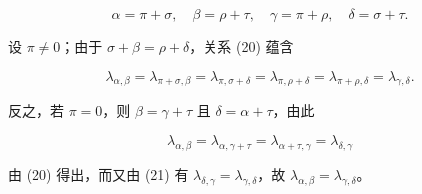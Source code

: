\[
\alpha = \pi + \sigma , \quad \beta = \rho + \tau , \quad \gamma = \pi + \rho , \quad \delta = \sigma + \tau .
\]

设 \(\pi \neq 0\)；由于 \(\sigma + \beta = \rho + \delta\)，关系 (20) 蕴含

\[
\lambda_ {\alpha , \beta} = \lambda_ {\pi + \sigma , \beta} = \lambda_ {\pi , \sigma + \delta} = \lambda_ {\pi , \rho + \delta} = \lambda_ {\pi + \rho , \delta} = \lambda_ {\gamma , \delta}.
\]

反之，若 \(\pi = 0\)，则 \(\beta = \gamma + \tau\) 且 \(\delta = \alpha + \tau\)，由此

\[
\lambda_ {\alpha , \beta} = \lambda_ {\alpha , \gamma + \tau} = \lambda_ {\alpha + \tau , \gamma} = \lambda_ {\delta , \gamma}
\]

由 (20) 得出，而又由 (21) 有 \(\lambda_{\delta, \gamma} = \lambda_{\gamma, \delta}\)，故 \(\lambda_{\alpha, \beta} = \lambda_{\gamma, \delta}\)。

